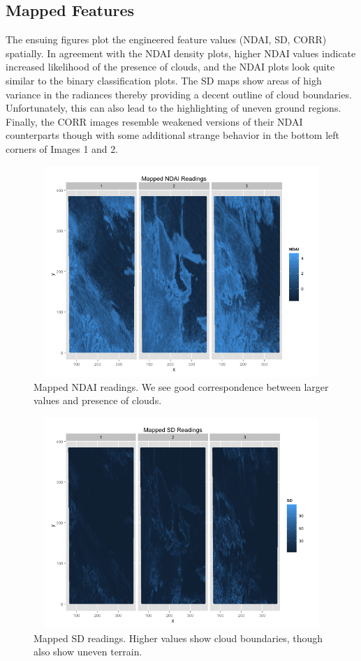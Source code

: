 \documentclass{article}\usepackage[]{graphicx}\usepackage[]{color}
\begin{document}
\subsection{Mapped Features}
The ensuing figures plot the engineered feature values (NDAI, SD, CORR) spatially. In agreement with the NDAI density plots, higher NDAI values indicate increased likelihood of the presence of clouds, and the NDAI plots look quite similar to the binary classification plots. The SD maps show areas of high variance in the radiances thereby providing a decent outline of cloud boundaries. Unfortunately, this can also lead to the highlighting of uneven ground regions. Finally, the CORR images resemble weakened versions of their NDAI counterparts though with some additional strange behavior in the bottom left corners of Images 1 and 2. 
\begin{figure}[H]
\includegraphics[width = 18cm, height = 8cm]{NDAIEDA.png}
\caption{Mapped NDAI readings. We see good correspondence between larger values and presence of clouds.}
\end{figure}

\begin{figure}[H]
\includegraphics[width = 18cm, height = 8cm]{SDEDA.png}
\caption{Mapped SD readings. Higher values show cloud boundaries, though also show uneven terrain.}
\end{figure}
\end{document}
